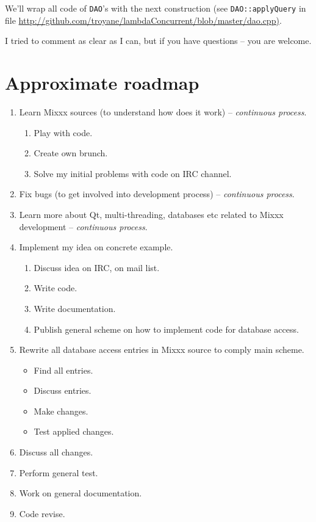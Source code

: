 \documentclass[a4paper,12pt]{scrartcl}
\begin{document}
We'll wrap all code of \texttt{DAO}'s with the next construction (see \texttt{DAO::applyQuery} in file \url{http://github.com/troyane/lambdaConcurrent/blob/master/dao.cpp)}.

I tried to comment as clear as I can, but if you have questions -- you are welcome.


\section{Approximate roadmap}
\begin{enumerate}
 \item Learn Mixxx sources (to understand how does it work) -- \textit{continuous process}.
 \begin{enumerate}
  \item Play with code.
  \item Create own brunch.
  \item Solve my initial problems with code on IRC channel.
 \end{enumerate}
 \item Fix bugs (to get involved into development process) -- \textit{continuous process}.
 \item Learn more about Qt, multi-threading, databases etc related to Mixxx development -- \textit{continuous process}.
 \item Implement my idea on concrete example.
 \begin{enumerate}
  \item Discuss idea on IRC, on mail list.
  \item Write code.
  \item Write documentation.
  \item Publish general scheme on how to implement code for database access.
 \end{enumerate}
 \item Rewrite all database access entries in Mixxx source to comply main scheme.
 \begin{itemize}
  \item Find all entries.
  \item Discuss entries.
  \item Make changes.
  \item Test applied changes.
 \end{itemize}
 \item Discuss all changes.
 \item Perform general test.
 \item Work on general documentation.
 \item Code revise.
\end{enumerate}
\end{document}
